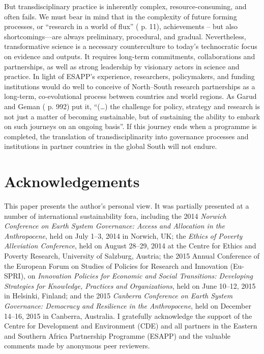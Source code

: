 \documentclass[10pt,a4paper]{article}
\begin{document}
\begin{multicols}{2}
But transdisciplinary practice is inherently complex, resource-consuming, and often fails. We must bear in mind that in the complexity of future forming processes, or ``research in a world of flux'' (\citep{r05} p. 11), achievements – but also shortcomings---are always preliminary, procedural, and gradual. Nevertheless, transformative science is a necessary counterculture to today's technocratic focus on evidence and outputs. It requires long-term commitments, collaborations and partnerships, as well as strong leadership by visionary actors in science and practice. In light of ESAPP's experience, researchers, policymakers, and funding institutions would do well to conceive of North–South research partnerships as a long-term, co-evolutional process between countries and world regions. As Garud and Geman (\citep{r42} p. 992) put it, ``(\ldots) the challenge for policy, strategy and research is not just a matter of becoming sustainable, but of sustaining the ability to embark on such journeys on an ongoing basis''. If this journey ends when a programme is completed, the translation of transdisciplinarity into governance processes and institutions in partner countries in the global South will not endure. 

\section*{Acknowledgements}
\noindent This paper presents the author’s personal view. It was partially presented at a number of international sustainability fora, including the 2014 \textit{Norwich Conference on Earth System Governance: Access and Allocation in the Anthropocene}, held on July 1--3, 2014 in Norwich, UK; the \textit{Ethics of Poverty Alleviation Conference}, held on August 28--29, 2014 at the Centre for Ethics and Poverty Research, University of Salzburg, Austria; the 2015 Annual Conference of the European Forum on Studies of Policies for Research and Innovation (Eu-SPRI), on \textit{Innovation Policies for Economic and Social Transitions: Developing Strategies for Knowledge, Practices and Organizations}, held on June 10--12, 2015 in Helsinki, Finland; and the 2015 \textit{Canberra Conference on Earth System Governance: Democracy and Resilience in the Anthropocene}, held on December 14--16, 2015 in Canberra, Australia. I gratefully acknowledge the support of the Centre for Development and Environment (CDE) and all partners in the Eastern and Southern Africa Partnership Programme (ESAPP) and the valuable comments made by anonymous peer reviewers.

\end{multicols}
\clearpage
\end{document}
